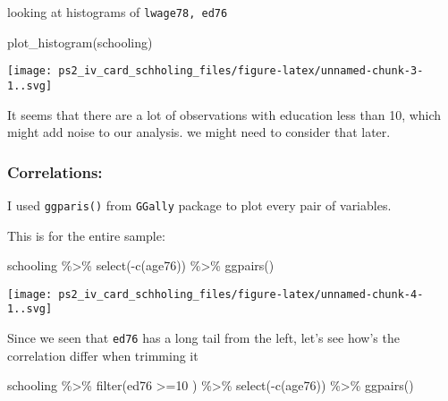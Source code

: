 \documentclass[
]{article}
\newenvironment{Shaded}{\begin{snugshade}}{\end{snugshade}}
\newcommand{\DecValTok}[1]{\textcolor[rgb]{0.00,0.00,0.81}{#1}}
\newcommand{\FunctionTok}[1]{\textcolor[rgb]{0.00,0.00,0.00}{#1}}
\newcommand{\NormalTok}[1]{#1}
\newcommand{\SpecialCharTok}[1]{\textcolor[rgb]{0.00,0.00,0.00}{#1}}
\begin{document}
looking at histograms of \texttt{lwage78,\ ed76}

\begin{Shaded}
\begin{Highlighting}[]
\FunctionTok{plot\_histogram}\NormalTok{(schooling)}
\end{Highlighting}
\end{Shaded}

\texttt{[image: ps2\_iv\_card\_schholing\_files/figure-latex/unnamed-chunk-3-1..svg]}

It seems that there are a lot of observations with education less than
10, which might add noise to our analysis. we might need to consider
that later.

\hypertarget{correlations}{%
\subsubsection{Correlations:}\label{correlations}}

I used \texttt{ggparis()} from \texttt{GGally} package to plot every
pair of variables.

This is for the entire sample:

\begin{Shaded}
\begin{Highlighting}[]
\NormalTok{schooling }\SpecialCharTok{\%\textgreater{}\%}
  \FunctionTok{select}\NormalTok{(}\SpecialCharTok{{-}}\FunctionTok{c}\NormalTok{(age76)) }\SpecialCharTok{\%\textgreater{}\%}
  \FunctionTok{ggpairs}\NormalTok{()}
\end{Highlighting}
\end{Shaded}

\texttt{[image: ps2\_iv\_card\_schholing\_files/figure-latex/unnamed-chunk-4-1..svg]}

Since we seen that \texttt{ed76} has a long tail from the left, let's
see how's the correlation differ when trimming it

\begin{Shaded}
\begin{Highlighting}[]
\NormalTok{schooling }\SpecialCharTok{\%\textgreater{}\%}
  \FunctionTok{filter}\NormalTok{(ed76 }\SpecialCharTok{\textgreater{}=}\DecValTok{10}\NormalTok{ ) }\SpecialCharTok{\%\textgreater{}\%}
  \FunctionTok{select}\NormalTok{(}\SpecialCharTok{{-}}\FunctionTok{c}\NormalTok{(age76)) }\SpecialCharTok{\%\textgreater{}\%}
  \FunctionTok{ggpairs}\NormalTok{()}
\end{Highlighting}
\end{Shaded}
\end{document}
